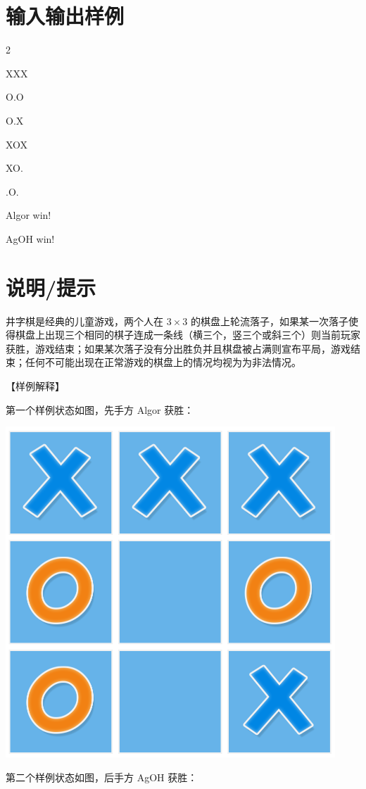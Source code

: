 \documentclass{../cpct/ctpro}
\begin{document}
\section*{输入输出样例}
\testcasetab
{
    2 \par
    XXX \par
    O.O \par
    O.X \par
    XOX \par
    XO. \par
    .O.
}
{
    Algor win! \par
    AgOH win!
}

\section*{说明/提示}

井字棋是经典的儿童游戏，两个人在 $3 \times 3$ 的棋盘上轮流落子，如果某一次落子使得棋盘上出现三个相同的棋子连成一条线（横三个，竖三个或斜三个）则当前玩家获胜，游戏结束；如果某次落子没有分出胜负并且棋盘被占满则宣布平局，游戏结束；任何不可能出现在正常游戏的棋盘上的情况均视为为非法情况。

【样例解释】

第一个样例状态如图，先手方 Algor 获胜：

\includegraphics[scale=0.5]{images/1.png}

第二个样例状态如图，后手方 AgOH 获胜：
\end{document}
